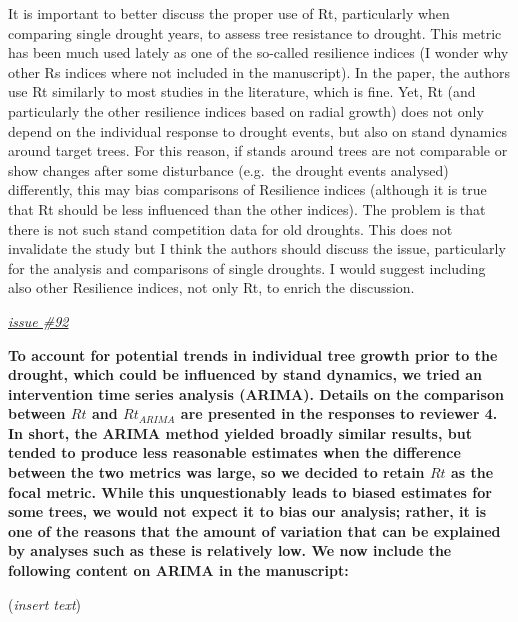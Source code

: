 \documentclass[
]{article}
\begin{document}
It is important to better discuss the proper use of Rt, particularly
when comparing single drought years, to assess tree resistance to
drought. This metric has been much used lately as one of the so-called
resilience indices (I wonder why other Rs indices where not included in
the manuscript). In the paper, the authors use Rt similarly to most
studies in the literature, which is fine. Yet, Rt (and particularly the
other resilience indices based on radial growth) does not only depend on
the individual response to drought events, but also on stand dynamics
around target trees. For this reason, if stands around trees are not
comparable or show changes after some disturbance (e.g.~the drought
events analysed) differently, this may bias comparisons of Resilience
indices (although it is true that Rt should be less influenced than the
other indices). The problem is that there is not such stand competition
data for old droughts. This does not invalidate the study but I think
the authors should discuss the issue, particularly for the analysis and
comparisons of single droughts. I would suggest including also other
Resilience indices, not only Rt, to enrich the discussion.

\href{https://github.com/SCBI-ForestGEO/McGregor_climate-sensitivity-variation/issues/92}{\emph{issue
\#92}}

\textbf{To account for potential trends in individual tree growth prior
to the drought, which could be influenced by stand dynamics, we tried an
intervention time series analysis (ARIMA). Details on the comparison
between \(Rt\) and \(Rt_{ARIMA}\) are presented in the responses to
reviewer 4. In short, the ARIMA method yielded broadly similar results,
but tended to produce less reasonable estimates when the difference
between the two metrics was large, so we decided to retain \(Rt\) as the
focal metric. While this unquestionably leads to biased estimates for
some trees, we would not expect it to bias our analysis; rather, it is
one of the reasons that the amount of variation that can be explained by
analyses such as these is relatively low. We now include the following
content on ARIMA in the manuscript:}

(\emph{insert text})
\end{document}
